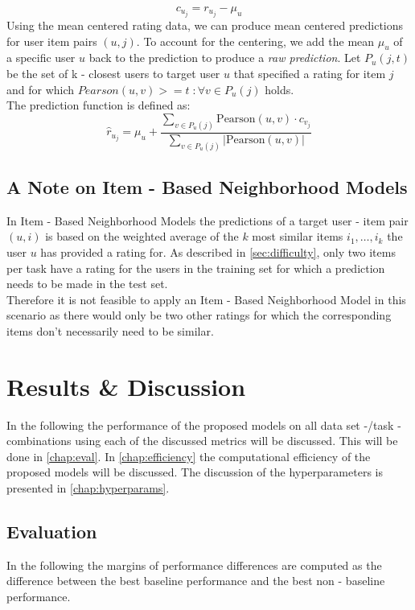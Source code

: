 \begin{equation}
    c_{u_j} = r_{u_j} - \mu_u
\end{equation}
Using the mean centered rating data, we can produce mean centered predictions for user item pairs $(u,j)$. To account for the centering, we add the mean $\mu_u$ of a specific user $u$ back to the prediction to produce a \textit{raw prediction}. Let $P_u(j,t)$ be the set of k - closest users to target user $u$ that specified a rating for item $j$ and for which $Pearson(u, v) >= t\;: \forall{v} \in P_u(j)$ holds.\\ The prediction function is defined as: 
\begin{equation}
    \hat{r}_{u_j} = \mu_u + \frac{\sum\limits_{v \in P_u(j)}\text{Pearson}(u, v) \cdot c_{v_j}}{\sum\limits_{v \in P_u(j)} |\text{Pearson}(u, v)|}
\end{equation}

\subsection{A Note on Item - Based Neighborhood Models}
In Item - Based Neighborhood Models the predictions of a target user - item pair $(u, i)$ is based on the weighted average of the $k$ most similar items $i_1,\dots,i_k$ the user $u$ has provided a rating for. As described in \ref{sec:difficulty}, only two items per task have a rating for the users in the training set for which a prediction needs to be made in the test set.\\
Therefore it is not feasible to apply an Item - Based Neighborhood Model in this scenario as there would only be two other ratings for which the corresponding items don't necessarily need to be similar.

\section{Results \& Discussion}
\label{sec:results}
In the following the performance of the proposed models on all data set -/task - combinations using each of the discussed metrics will be discussed. This will be done in \autoref{chap:eval}. In \autoref{chap:efficiency} the computational efficiency of the proposed models will be discussed. The discussion of the hyperparameters is presented in \autoref{chap:hyperparams}.

\subsection{Evaluation}
\label{chap:eval}
In the following the margins of performance differences are computed as the difference between the best baseline performance and the best non - baseline performance.\\ 

